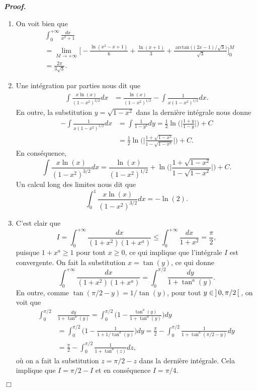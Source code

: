 \documentclass[11pt,a4paper]{article}
\newenvironment{preuve}[1][]
{\vskip 2mm  \noindent\emph{\bf Proof#1. }}{$\Box$ \vskip 2mm}
\let\geq\geqslant
\let\leq\leqslant
\begin{document}
\begin{preuve}
\begin{enumerate}
\begin{enumerate}[label=(\roman*)]
				\item On voit bien que 
				\begin{align*}
				&\int_{0}^{+\infty} \frac{dx}{x^{3}+1} 
				\\
				&= \underset{M \rightarrow + \infty}{\lim} \bigg[ -\frac{\ln(x^{2}-x+1)}{6} + \frac{\ln(x+1)}{3} + \frac{\arctan\big((2x-1)/\sqrt{3}\big)}{\sqrt{3}} \bigg]_{0}^{M} 
				\\
				&= \frac{2 \pi}{3 \sqrt{3}}.     
				\end{align*}
				
				\item Une intégration par parties nous dit que  
				\begin{align*}
				\int \frac{x\ln (x)}{(1-x^{2})^{3/2}}dx &= \frac{\ln(x)}{(1-x^{2})^{1/2}} - \int \frac{1}{x(1-x^{2})^{1/2}}dx.     
				\end{align*}
				En outre, la substitution $y = \sqrt{1-x^{2}}$ dans la dernière intégrale nous donne
				\begin{align*}
				- \int \frac{1}{x(1-x^{2})^{1/2}}dx &= \int \frac{1}{1-y^{2}}dy = \frac{1}{2} \ln \bigg( \bigg| \frac{1+ y}{1-y} \bigg|\bigg) + C 
				\\
				&= \frac{1}{2} \ln \bigg( \bigg| \frac{1+ \sqrt{1-x^{2}}}{1- \sqrt{1-x^{2}}} \bigg|\bigg) + C.     
				\end{align*}
				En conséquence, 
				\[          \int \frac{x\ln (x)}{(1-x^{2})^{3/2}}dx = \frac{\ln(x)}{(1-x^{2})^{1/2}} +  \ln \bigg( \bigg| \frac{1+ \sqrt{1-x^{2}}}{1- \sqrt{1-x^{2}}} \bigg|\bigg) + C.     \]
				Un calcul long des limites nous dit que 
				\[          \int_{0}^{1} \frac{x\ln (x)}{(1-x^{2})^{3/2}}dx = - \ln(2).     \]
				
				\item C'est clair que 
				\[     I = \int_{0}^{+\infty} \frac{dx}{(1+x^{2})(1+x^{a})} \leq \int_{0}^{+\infty} \frac{dx}{1+x^{2}} = \frac{\pi}{2},     \]
				puisque $1+x^{a} \geq 1$ pour tout $x \geq 0$, ce qui implique que l'intégrale $I$ est convergente. 
				On fait la substitution $x = \tan(y)$, ce qui donne 
				\[     \int_{0}^{+\infty} \frac{dx}{(1+x^{2})(1+x^{a})} = \int_{0}^{\pi/2} \frac{dy}{1+\tan^{a}(y)}.     \]
				En outre, comme $\tan(\pi/2 - y) = 1/\tan(y)$, pour tout $y \in \hskip 0.6mm ] \hskip 0.6mm 0, \pi/2 \hskip 0.6mm [ \hskip 0.6mm$, on voit que 
				\begin{align*}    
				\int_{0}^{\pi/2} &\frac{dy}{1+\tan^{a}(y)} = \int_{0}^{\pi/2} \bigg(1 - \frac{\tan^{a}(y)}{1+\tan^{a}(y)}\bigg) dy 
				\\
				&= \int_{0}^{\pi/2} \bigg(1 - \frac{1}{1+1/\tan^{a}(y)}\bigg) dy 
				= \frac{\pi}{2} - \int_{0}^{\pi/2} \frac{1}{1+\tan^{a}(\pi/2-y)} dy 
				\\
				&= \frac{\pi}{2} - \int_{0}^{\pi/2} \frac{1}{1+\tan^{a}(z)} dz,
				\end{align*}
				où on a fait la substitution $z = \pi/2 - z$ dans la dernière intégrale. 
				Cela implique que $I = \pi/2 - I$ et en conséquence $I = \pi/4$. 
				

\end{enumerate}
\end{enumerate}
\end{preuve}
\end{document}
